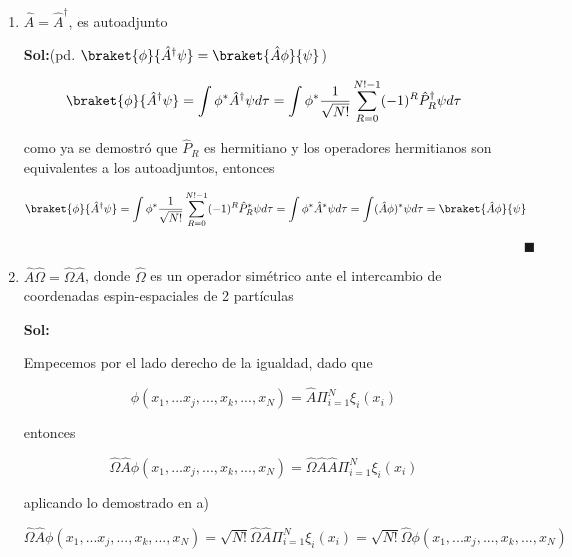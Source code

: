 \documentclass[12pt,a4paper]{article}
\begin{document}
\begin{enumerate}
\begin{enumerate}
    
    
    
    \item $\hat{A} = \hat{A}^{\dagger}$, es autoadjunto
    
    \textbf{Sol:}(pd. $\braket{\phi}{\hat{A}^{\dagger} \psi} = \braket{\hat{A}\phi}{\psi}$)
    
   \begin{equation*}
       \braket{\phi}{\hat{A}^{\dagger} \psi}= \int \phi^* \hat{A}^{\dagger} \psi d\tau =\int \phi^* \frac{1}{\sqrt{N!}} \sum_{R=0}^{N!-1} (-1)^R \hat{P}_{R}^{\dagger} \psi d\tau
   \end{equation*}
   
   
   
   como ya se demostró que $\hat{P}_R$ es hermitiano y los operadores hermitianos son equivalentes a los autoadjuntos, entonces
   
   \begin{equation*}
       \braket{\phi}{\hat{A}^{\dagger} \psi}=\int \phi^* \frac{1}{\sqrt{N!}} \sum_{R=0}^{N!-1} (-1)^R \hat{P}_{R}^{*} \psi d\tau=\int \phi^* \hat{A}^* \psi d\tau= \int (\hat{A}\phi)^* \psi d\tau = \braket{\hat{A}\phi}{\psi}
   \end{equation*}
   
   $\hspace{15cm} \blacksquare$
    
    \item $\hat{A}\hat{\Omega} = \hat{\Omega} \hat{A}$, donde $\hat{\Omega}$ es un operador simétrico ante el intercambio de coordenadas espin-espaciales de 2 partículas
    
    \textbf{Sol:}
    
    Empecemos por el lado derecho de la igualdad, dado que
    
    \begin{equation*}
        \phi(x_1,...x_j,...,x_k,...,x_N) = \hat{A} \Pi_{i=1}^{N} \xi_i (x_i)
    \end{equation*}
    
    entonces
    
    \begin{equation*}
        \hat{\Omega }\hat{A}  \phi(x_1,...x_j,...,x_k,...,x_N) =\hat{\Omega} \hat{A}  \hat{A} \Pi_{i=1}^{N} \xi_i (x_i) 
    \end{equation*}
    
    aplicando lo demostrado en a)
    
    \begin{equation*}
        \hat{\Omega }\hat{A}  \phi(x_1,...x_j,...,x_k,...,x_N) = \sqrt{N!} \hat{\Omega} \hat{A} \Pi_{i=1}^{N} \xi_{i} (x_i) = \sqrt{N!} \hat{\Omega}  \phi(x_1,...x_j,...,x_k,...,x_N)
    \end{equation*}
    

\end{enumerate}
\end{enumerate}
\end{document}
